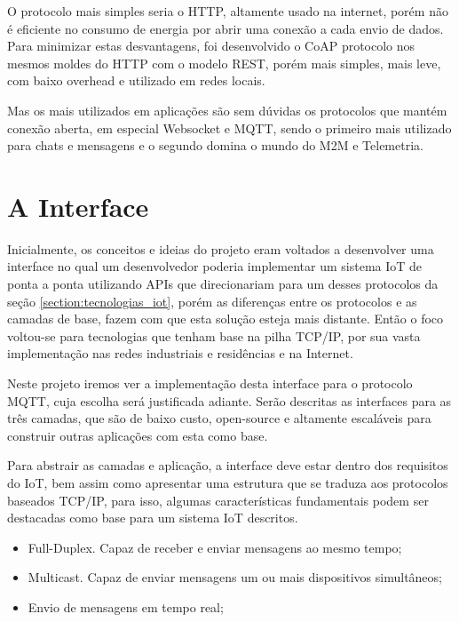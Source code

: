 O protocolo mais simples seria o HTTP, altamente usado na internet, porém não é eficiente no consumo de energia por abrir uma conexão a cada envio de dados. Para minimizar estas desvantagens, foi desenvolvido o CoAP \cite{coap} protocolo nos mesmos moldes do HTTP com o modelo REST, porém mais simples, mais leve, com baixo overhead e utilizado em redes locais.

Mas os mais utilizados em aplicações são sem dúvidas os protocolos que mantém conexão aberta, em especial Websocket e MQTT, sendo o primeiro mais utilizado para chats e mensagens e o segundo domina o mundo do M2M e Telemetria.


\section{A Interface}
\label{section:interface}

Inicialmente, os conceitos e ideias do projeto eram voltados a desenvolver uma interface no qual um desenvolvedor poderia implementar um sistema IoT de ponta a ponta utilizando APIs que direcionariam para um desses protocolos da seção \ref{section:tecnologias_iot}, porém as diferenças entre os protocolos e as camadas de base, fazem com que esta solução esteja mais distante. Então o foco voltou-se  para tecnologias que tenham base na pilha TCP/IP, por sua vasta implementação nas redes industriais e residências e na Internet.

Neste projeto iremos ver a implementação desta interface para o protocolo MQTT, cuja escolha será justificada adiante. Serão descritas as interfaces para as três camadas, que são de baixo custo, open-source e altamente escaláveis para construir outras aplicações com esta como base.
 
Para abstrair as camadas e aplicação, a interface deve estar dentro dos requisitos do IoT, bem assim como apresentar uma estrutura que se traduza aos protocolos baseados TCP/IP, para isso, algumas características fundamentais podem ser destacadas como base para um sistema IoT descritos.

\begin{itemize}

\item Full-Duplex. Capaz de receber e enviar mensagens ao mesmo tempo;
\item Multicast. Capaz de enviar mensagens um ou mais dispositivos simultâneos;
\item Envio de mensagens em tempo real;

\end{itemize}


